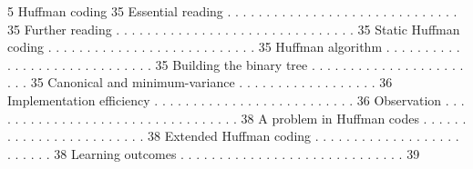 5 Huffman coding 35
Essential reading . . . . . . . . . . . . . . . . . . . . . . . . . . . . . . 35
Further reading . . . . . . . . . . . . . . . . . . . . . . . . . . . . . . . 35
Static Huffman coding . . . . . . . . . . . . . . . . . . . . . . . . . . . 35
Huffman algorithm . . . . . . . . . . . . . . . . . . . . . . . . . . . . . 35
Building the binary tree . . . . . . . . . . . . . . . . . . . . . . . 35
Canonical and minimum-variance . . . . . . . . . . . . . . . . . . 36
Implementation efficiency . . . . . . . . . . . . . . . . . . . . . . . . . . 36
Observation . . . . . . . . . . . . . . . . . . . . . . . . . . . . . . . . . 38
A problem in Huffman codes . . . . . . . . . . . . . . . . . . . . . . . . 38
Extended Huffman coding . . . . . . . . . . . . . . . . . . . . . . . . . 38
Learning outcomes . . . . . . . . . . . . . . . . . . . . . . . . . . . . . 39
